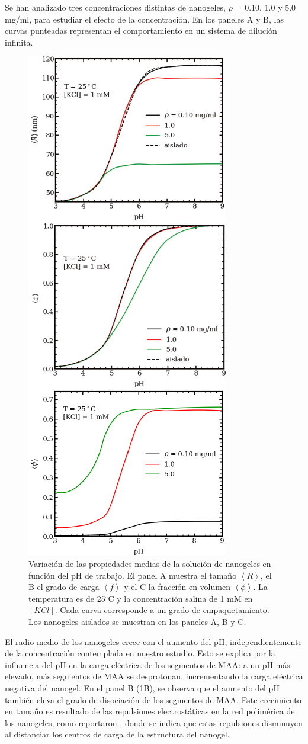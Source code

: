 	
	 Se han analizado tres concentraciones distintas de nanogeles, $\rho$ = 0.10, 1.0 y 5.0 mg/ml, para estudiar el efecto de la concentraci\'on. En los paneles A y B, las curvas punteadas representan el comportamiento en un sistema de diluci\'on infinita.
	
	\begin{figure}[!htb]
		\centering
		\includegraphics[width=0.4\linewidth]{Figures/graph-mc/xvspH.pdf}
		\caption{Variaci\'on de las propiedades medias de la soluci\'on de nanogeles en funci\'on del pH de trabajo. El panel A muestra el tama\~no $\left<R\right>$, el B el grado de carga $\left<f\right>$ y el C la fracci\'on en volumen $\left<\phi\right>$. La temperatura es de 25$^\circ$C y la concentraci\'on salina de 1 mM en $[KCl]$. Cada curva corresponde a un grado de empaquetamiento. Los nanogeles aislados se muestran en los paneles A, B y C.}
		\label{fig:mc:xvspH}
	\end{figure}
	
	El radio medio de los nanogeles crece con el aumento del pH, independientemente de la concentraci\'on contemplada en nuestro estudio. Esto se explica por la  influencia del pH en la carga el\'ectrica de los segmentos de MAA: a un pH m\'as elevado, m\'as segmentos de MAA se desprotonan, incrementando la carga el\'ectrica negativa del nanogel. En el panel B (\ref{fig:mc:xvspH}B), se observa que el aumento del pH tambi\'en eleva el grado de disociaci\'on de los segmentos de MAA. Este crecimiento en tama\~no es resultado de las repulsiones electrost\'aticas en la red polim\'erica de los nanogeles, como reportaron \citet{perez2021thermodynamic}, donde se indica que estas repulsiones disminuyen al distanciar los centros de carga de la estructura del nanogel.
	
